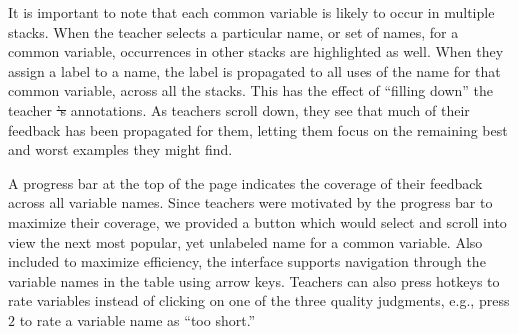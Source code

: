 \documentclass[12pt,twoside]{mitthesis}
\providecommand{\DIFaddtex}[1]{{\protect\color{blue}\uwave{#1}}} %
\providecommand{\DIFdeltex}[1]{{\protect\color{red}\sout{#1}}}                      %
\providecommand{\DIFaddbegin}{} %
\providecommand{\DIFaddend}{} %
\providecommand{\DIFdelbegin}{} %
\providecommand{\DIFdelend}{} %
\providecommand{\DIFadd}[1]{\texorpdfstring{\DIFaddtex{#1}}{#1}} %
\providecommand{\DIFdel}[1]{\texorpdfstring{\DIFdeltex{#1}}{}} %
\begin{document}
{{{{{{{{{{It is important to note that each common variable is likely to occur in multiple stacks. When the teacher selects a particular name, or set of names, for a common variable, occurrences in other stacks are highlighted as well. When they assign a label to a name, the label is propagated to all uses of the name for that common variable, across all the stacks. This has the effect of ``filling down'' the teacher \DIFdelbegin \DIFdel{'s }\DIFdelend annotations. As teachers scroll down, they see that much of their feedback has been propagated for them, letting them focus on the remaining best and worst examples they might find. 

A progress bar at the top of the page indicates the coverage of their feedback across all variable names. Since teachers were motivated by the progress bar to maximize their coverage, we provided a button which would select and scroll into view the next most popular, yet unlabeled name for a common variable. Also included to maximize efficiency, the interface supports navigation through the variable names in the table using arrow keys. Teachers can also press hotkeys to rate variables instead of clicking on one of the three quality judgments, e.g., press \DIFdelbegin \DIFdel{$2$ }\DIFdelend \DIFaddbegin \texttt{\DIFadd{2}} \DIFaddend to rate a variable name as ``too short.''

}}}}}}}}}}
\end{document}
